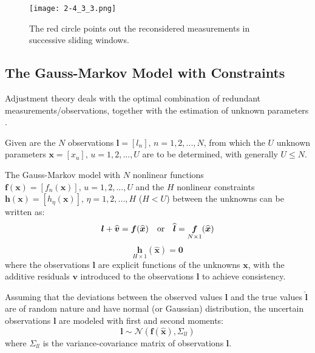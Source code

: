 \begin{figure}
	\centering
	\texttt{[image: 2-4\_3\_3.png]}
	\caption{\small The red circle points out the reconsidered measurements in successive sliding windows.}
	\label{fig:overlappingregion}
\end{figure}




\clearpage
\subsection{The Gauss-Markov Model with Constraints}
\label{subsec:LSmodel}

Adjustment theory deals with the optimal combination of redundant measurements/observations, together with the estimation of unknown parameters \cite{Teunissen2000}.

Given are the $N$ observations $\boldsymbol l=[l_n],\,n=1,2,...,N$, from which the $U$ unknown parameters $\boldsymbol x=[x_u],\,u=1,2,...,U$ are to be determined, with generally $U\leq N$.%

The Gauss-Markov model with $N$ nonlinear functions $\boldsymbol f(\boldsymbol x)=[f_n(\boldsymbol x)],\,u=1,2,...,U$ and the $H$ nonlinear constraints $\boldsymbol h(\boldsymbol x)=[h_\eta(\boldsymbol x)],\,\eta=1,2,...,H$ %
($H<U$) between the unknowns can be written as:
\begin{equation} \label{eq:GM-ObsEq}
\boldsymbol l+\widehat{\boldsymbol v}=\boldsymbol f(\widehat{\boldsymbol x})\quad \textnormal{or}\quad \widehat{\boldsymbol l}=\underset{N\times 1}{\boldsymbol f}(\widehat{\boldsymbol x})
\end{equation}
\begin{equation} \label{eq:GM-ConEq}
\underset{H\times 1}{\boldsymbol h}(\widehat{\boldsymbol x})=\mathbf{0}
\end{equation}
where the observations $\boldsymbol l$ are explicit functions of the unknowns $\boldsymbol x$, with the additive residuals $\boldsymbol v$ introduced to the observations $\boldsymbol l$ to achieve consistency.

Assuming that the deviations between the observed values $\boldsymbol l$ and the true values $\widehat{\boldsymbol l}$ are of random nature and have normal (or Gaussian) distribution, the uncertain observations $\boldsymbol l$ are modeled with first and second moments:
\begin{equation}
\boldsymbol l\sim\mathcal{N}(\boldsymbol f(\widehat{\boldsymbol x}) ,\mathsf{\Sigma}_{ll})
\end{equation}
where $\mathsf{\Sigma}_{ll}$ is the variance-covariance matrix of observations $\boldsymbol l$.%



